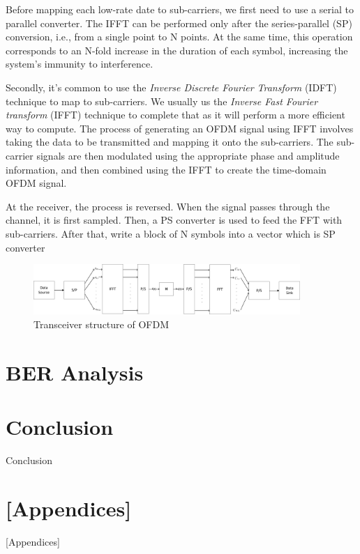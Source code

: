 \documentclass{article}
\numberwithin{figure}{section}
\begin{document}
Before mapping each low-rate date to sub-carriers, we first need to use a serial to parallel converter. The IFFT can be performed only after the series-parallel (SP) conversion, i.e., from a single point to N points. At the same time, this operation corresponds to an N-fold increase in the duration of each symbol, increasing the system's immunity to interference.

Secondly, it's common to use the \textit{Inverse Discrete Fourier Transform} (IDFT) technique to map to sub-carriers. We usually us the \textit{Inverse Fast Fourier transform} (IFFT) technique to complete that as it will perform a more efficient way to compute. The process of generating an OFDM signal using IFFT involves taking the data to be transmitted and mapping it onto the sub-carriers. The sub-carrier signals are then modulated using the appropriate phase and amplitude information, and then combined using the IFFT to create the time-domain OFDM signal. 

At the receiver, the process is reversed. When the signal passes through the channel, it is first sampled. Then, a PS converter is used to feed the FFT with sub-carriers. After that, write a block of N symbols into a vector which is SP converter

\begin{figure}[!ht]
  \centering
  \includegraphics[width=0.9\textwidth]{images/OFDM_transceiver.pdf}
  \caption{Transceiver structure of OFDM}
  \label{fig:env}
\end{figure}

\part{BER Analysis}

\part{Conclusion}
Conclusion

\part{[Appendices]}
[Appendices]



\end{document}
